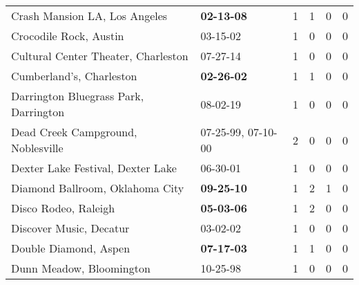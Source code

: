 \begin{longtable}{p{}p{}p{}p{}p{}p{}}
                                                Crash Mansion LA, Los Angeles &                                       \textbf{02-13-08\textsuperscript{}} &  1 &  1 &  0 &  0 \\
                                                       Crocodile Rock, Austin &                                                03-15-02\textsuperscript{} &  1 &  0 &  0 &  0 \\
                                          Cultural Center Theater, Charleston &                                                07-27-14\textsuperscript{} &  1 &  0 &  0 &  0 \\
                                                     Cumberland's, Charleston &                                       \textbf{02-26-02\textsuperscript{}} &  1 &  1 &  0 &  0 \\
                                        Darrington Bluegrass Park, Darrington &                                                08-02-19\textsuperscript{} &  1 &  0 &  0 &  0 \\
                                           Dead Creek Campground, Noblesville &                    07-25-99\textsuperscript{}, 07-10-00\textsuperscript{} &  2 &  0 &  0 &  0 \\
                                            Dexter Lake Festival, Dexter Lake &                                                06-30-01\textsuperscript{} &  1 &  0 &  0 &  0 \\
                                              Diamond Ballroom, Oklahoma City &                                       \textbf{09-25-10\textsuperscript{}} &  1 &  2 &  1 &  0 \\
                                                         Disco Rodeo, Raleigh &                                       \textbf{05-03-06\textsuperscript{}} &  1 &  2 &  0 &  0 \\
                                                      Discover Music, Decatur &                                                03-02-02\textsuperscript{} &  1 &  0 &  0 &  0 \\
                                                        Double Diamond, Aspen &                                       \textbf{07-17-03\textsuperscript{}} &  1 &  1 &  0 &  0 \\
                                                     Dunn Meadow, Bloomington &                                                10-25-98\textsuperscript{} &  1 &  0 &  0 &  0 \\

\end{longtable}
